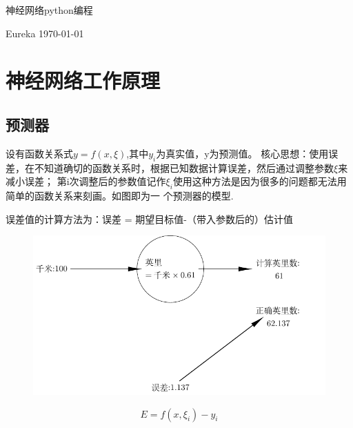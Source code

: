\documentclass[12pt]{article}
\title{}
\date{\today}
\author{}
\begin{document}
    
    \begin{titlepage}
        \centering
        \vspace{0.2\textheight}  
        {\huge 神经网络python编程}
        \vspace{0.025\textheight}
        \vspace{0.1\textheight}

        {\Large Eureka}
        \vfill 
        {\large \today}
        \vspace{0.1\textheight} 
    \end{titlepage}
    \tableofcontents
    \newpage

    \section{神经网络工作原理}
    \subsection{预测器}
    设有函数关系式$y=f(x,\xi)$,其中$y_i$为真实值，y为预测值。
    核心思想：使用误差，在不知道确切的函数关系时，根据已知数据计算误差，然后通过调整参数$\xi$来减小误差；
    第i次调整后的参数值记作$\xi_{i}$使用这种方法是因为很多的问题都无法用简单的函数关系来刻画。如图即为一
    个预测器的模型.
    
    误差值的计算方法为：误差 = 期望目标值-（带入参数后的）估计值
    \begin{figure}[!htb]
        \centering
        \includegraphics[scale=1]{./picture/gapsGenerate.pdf}
    \end{figure}
    \vspace{1em}

    \begin{equation}
         E = f(x,\xi_{i})-y_{i}
    \end{equation}
\end{document}

